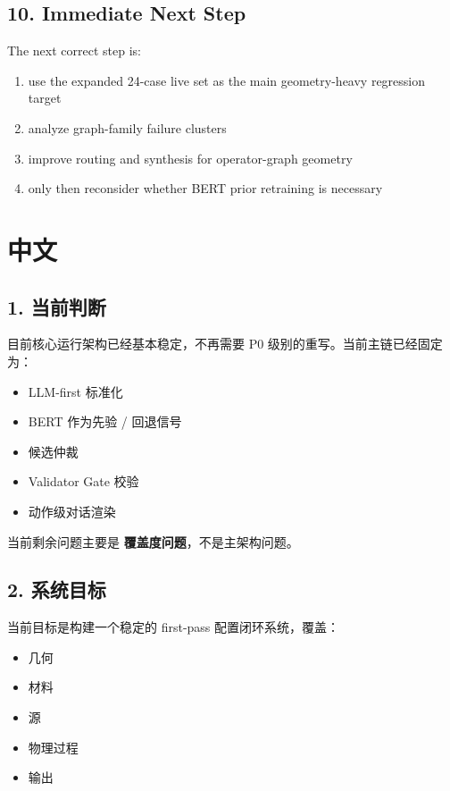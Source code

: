 \documentclass[11pt,a4paper]{ctexart}
\begin{document}
\subsection*{10. Immediate Next Step}

The next correct step is:

\begin{enumerate}
\item use the expanded 24-case live set as the main geometry-heavy regression target
\item analyze graph-family failure clusters
\item improve routing and synthesis for operator-graph geometry
\item only then reconsider whether BERT prior retraining is necessary
\end{enumerate}

\newpage
\section*{中文}

\subsection*{1. 当前判断}

目前核心运行架构已经基本稳定，不再需要 P0 级别的重写。当前主链已经固定为：

\begin{itemize}
\item LLM-first 标准化
\item BERT 作为先验 / 回退信号
\item 候选仲裁
\item Validator Gate 校验
\item 动作级对话渲染
\end{itemize}

当前剩余问题主要是 \textbf{覆盖度问题}，不是主架构问题。

\subsection*{2. 系统目标}

当前目标是构建一个稳定的 first-pass 配置闭环系统，覆盖：

\begin{itemize}
\item 几何
\item 材料
\item 源
\item 物理过程
\item 输出
\end{itemize}
\end{document}
